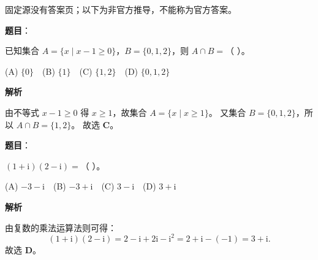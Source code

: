 
\begin{gktip}
固定源没有答案页；以下为非官方推导，不能称为官方答案。
\end{gktip}


\begin{answer}

\textbf{题目}：

已知集合 $A = \{x \mid x - 1 \geqslant 0\}$，$B = \{0, 1, 2\}$，则 $A \cap B =$（ ）。

(A) $\{0\}$　(B) $\{1\}$　(C) $\{1, 2\}$　(D) $\{0, 1, 2\}$

\textbf{解析}

由不等式 $x - 1 \geqslant 0$ 得 $x \geqslant 1$，故集合 $A = \{x \mid x \geqslant 1\}$。
又集合 $B = \{0, 1, 2\}$，所以 $A \cap B = \{1, 2\}$。
故选 \textbf{C}。


\end{answer}
\begin{answer}

\textbf{题目}：

$(1 + \mathrm i)(2 - \mathrm i) =$（ ）。

(A) $-3 - \mathrm i$　(B) $-3 + \mathrm i$　(C) $3 - \mathrm i$　(D) $3 + \mathrm i$

\textbf{解析}

由复数的乘法运算法则可得：
\nopagebreak[4]
\[(1 + \mathrm i)(2 - \mathrm i) = 2 - \mathrm i + 2\mathrm i - \mathrm i^2 = 2 + \mathrm i - (-1) = 3 + \mathrm i.\]
故选 \textbf{D}。


\end{answer}
